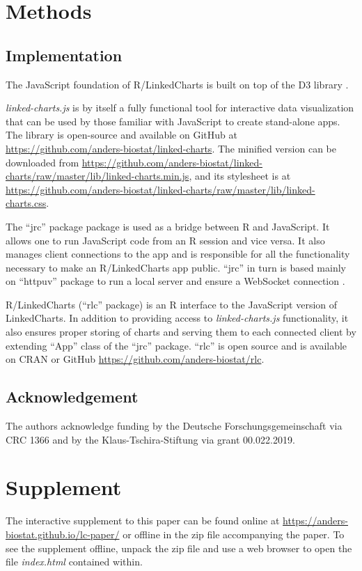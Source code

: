 \documentclass[twocolumn,10pt]{article}
\begin{document}
\section{Methods}

\subsection{Implementation}

The JavaScript foundation of R/LinkedCharts is built on top of the D3 library \citep{bostock_2011}. 

\emph{linked-charts.js} is by itself a fully functional tool for interactive data visualization that can be used by those familiar with JavaScript to create stand-alone apps. The library is open-source and available on GitHub at \url{https://github.com/anders-biostat/linked-charts}. The minified version can be downloaded from \url{https://github.com/anders-biostat/linked-charts/raw/master/lib/linked-charts.min.js}, and its stylesheet is at \url{https://github.com/anders-biostat/linked-charts/raw/master/lib/linked-charts.css}.

The ``jrc'' package \citep{jrc_2020} package is used as a bridge between R and JavaScript. It allows one to run JavaScript code from an R session and vice versa. It also manages client connections to the app and is responsible for all the functionality necessary to make an R/LinkedCharts app public. ``jrc'' in turn is based mainly on ``httpuv'' \citep{cheng_2020} package to run a local server and ensure a WebSocket connection \citep{fette_rfc_2011}. 

R/LinkedCharts (``rlc'' package) is an R \citep{R_2019} interface to the JavaScript version of LinkedCharts. In addition to providing access to \emph{linked-charts.js} functionality, it also ensures proper storing of charts and serving them to each connected client by extending ``App'' class of the ``jrc'' package. ``rlc'' is open source and is available on CRAN or GitHub \url{https://github.com/anders-biostat/rlc}.

\subsection{Acknowledgement}

The authors acknowledge funding by the Deutsche Forschungsgemeinschaft via CRC 1366 and by the Klaus-Tschira-Stiftung via grant 00.022.2019.

\section{Supplement}

The interactive supplement to this paper can be found online at \url{https://anders-biostat.github.io/lc-paper/} or offline in the zip file accompanying the paper. To see the supplement offline, unpack the zip file and use a web browser to open the file \emph{index.html} contained within.


\begin{small} 

\end{small}
\end{document}
